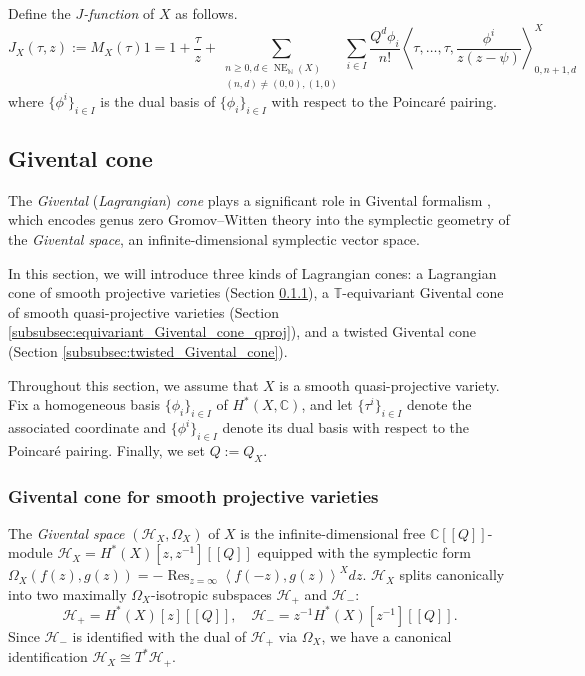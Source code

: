 \documentclass[a4paper,12pt]{amsart}
\numberwithin{equation}{section}
\theoremstyle{definition}
\newcommand{\C}{\mathbb{C}}
\newcommand{\N}{\mathbb{N}}
\newcommand{\T}{\mathbb{T}}
\newcommand{\cH}{\mathcal{H}}
\newcommand{\NE}{\operatorname{NE}_{\N}}
\newcommand{\Res}{\operatorname{Res}}
\def\corr#1{\left\langle#1 \right\rangle}
\begin{document}
Define the \emph{$J$-function} of $X$ as follows.
\begin{equation}\label{eqn:J-function}
    J_X(\tau,z):= M_X(\tau)1 = 1 + \frac{\tau}{z} + \sum_{ \substack{n\geq0,d\in\NE(X) \\ (n,d)\neq(0,0),(1,0)} } \sum_{i\in I} \frac{Q^d\phi_i}{n!} \corr{\tau,\dots,\tau,\frac{\phi^i}{z(z-\psi)}}^X_{0,n+1,d}
\end{equation}
where $\{\phi^i\}_{i\in I}$ is the dual basis of $\{\phi_i\}_{i\in I}$ with respect to the Poincar\'{e} pairing.


\subsection{Givental cone}\label{subsec:Givental_cone}
The \emph{Givental} (\emph{Lagrangian}) \emph{cone} plays a significant role in Givental formalism \cite{Givental:quantization,Givental:symplectic}, which encodes genus zero Gromov--Witten theory into the symplectic geometry of the \emph{Givental space}, an infinite-dimensional symplectic vector space.

In this section, we will introduce three kinds of Lagrangian cones: a Lagrangian cone of smooth projective varieties (Section \ref{subsubsec:Givental_cone}), a $\T$-equivariant Givental cone of smooth quasi-projective varieties (Section \ref{subsubsec:equivariant_Givental_cone_qproj}), and a twisted Givental cone (Section \ref{subsubsec:twisted_Givental_cone}).

Throughout this section, we assume that $X$ is a smooth quasi-projective variety.
Fix a homogeneous basis $\{\phi_i\}_{i\in I}$ of $H^*(X,\C)$, and let $\{\tau^i\}_{i\in I}$ denote the associated coordinate and $\{\phi^i\}_{i\in I}$ denote its dual basis with respect to the Poincar\'{e} pairing.
Finally, we set $Q:=Q_X$. 

\subsubsection{Givental cone for smooth projective varieties}\label{subsubsec:Givental_cone}

The \emph{Givental space} $(\cH_X,\Omega_X)$ of $X$ is the infinite-dimensional free $\C[\![Q]\!]$-module $\cH_X = H^*(X)[z,z^{-1}][\![Q]\!]$ equipped with the symplectic form $\Omega_X(f(z),g(z)) = -\Res_{z=\infty}\corr{f(-z),g(z)}^Xdz$.
$\cH_X$ splits canonically into two maximally $\Omega_X$-isotropic subspaces $\cH_+$ and $\cH_{-}$:
\[
\cH_+ = H^*(X)[z][\![Q]\!], \quad \cH_- = z^{-1}H^*(X)[z^{-1}][\![Q]\!].
\]
Since $\cH_-$ is identified with the dual of $\cH_+$ via $\Omega_X$, we have a canonical identification $\cH_X\cong T^*\cH_+$. 
\end{document}

